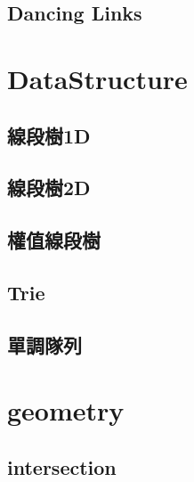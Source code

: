    \subsection{Dancing Links}
        

\section{DataStructure}
    \subsection{線段樹1D}
        
    \subsection{線段樹2D}
        
    \subsection{權值線段樹}
        
    \subsection{Trie}
        
    \subsection{單調隊列}
        
        
\section{geometry}
    \subsection{intersection}
        
